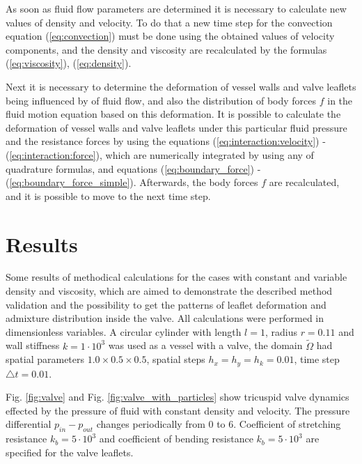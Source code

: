 \documentclass[runningheads,a4paper]{llncs}
\begin{document}
As soon as fluid flow parameters are determined it is necessary to calculate new values of density and velocity. To do that a new time step for the convection
equation (\ref{eq:convection}) must be done using the obtained values of velocity components, and the density and viscosity are recalculated
by the formulas (\ref{eq:viscosity}), (\ref{eq:density}).

Next it is necessary to determine the deformation of vessel walls and valve leaflets being influenced by of fluid flow, and also the distribution of body forces $f$
in the fluid motion equation based on this deformation. It is possible to calculate the deformation of vessel walls and valve leaflets under this particular fluid pressure
and the resistance forces by using the equations (\ref{eq:interaction:velocity}) - (\ref{eq:interaction:force}), which are numerically integrated by
using any of quadrature formulas, and equations (\ref{eq:boundary_force}) - (\ref{eq:boundary_force_simple}). Afterwards, the body forces $f$
are recalculated, and it is possible to move to the next time step.

\section{Results}

Some results of methodical calculations for the cases with constant and variable density and viscosity, which are aimed to demonstrate the described method 
validation and the possibility to get the patterns of leaflet deformation and admixture distribution inside the valve.
All calculations were performed in dimensionless variables. 
A circular cylinder with length $l = 1$, radius $r = 0.11$ and wall stiffness $k = 1 \cdot 10^3$ was used as a vessel with a valve,
the domain $\tilde{\Omega}$ had spatial parameters $1.0 \times 0.5 \times 0.5$,
spatial steps $h_x = h_y = h_k = 0.01$, time step $\triangle t = 0.01$.

Fig. \ref{fig:valve} and Fig. \ref{fig:valve_with_particles} show tricuspid valve dynamics effected by the pressure of fluid with constant density and velocity.
The pressure differential $p_{in} - p_{out}$ changes periodically from 0 to 6. Coefficient of stretching resistance $k_b = 5 \cdot 10^3$ and coefficient of
bending resistance $k_b = 5 \cdot 10^3$ are specified for the valve leaflets.
\end{document}
